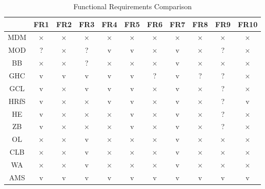 \begin{table}[H]
    \centering
    \bgroup
    \def\arraystretch{1.5}
    \begin{tabular}{|c|c|c|c|c|c|c|c|c|c|c|}
    \hline
         & FR1 & FR2 & FR3 & FR4 & FR5 & FR6 & FR7 & FR8 & FR9 & FR10 \\ \hline
        MDM & × & × & × & × & × & × & × & × & × & × \\ \hline
        MOD & ? & × & ? & v & v & × & v & × & ? & × \\ \hline
        BB & × & × & ? & × & × & × & v & × & × & × \\ \hline
        GHC & v & v & v & v & v & ? & v & ? & ? & × \\ \hline
        GCL & v & × & v & v & v & × & v & × & ? & × \\ \hline
        HRfS & v & × & × & v & v & × & v & × & ? & v \\ \hline
        HE & v & × & × & × & v & × & v & × & ? & × \\ \hline
        ZB & v & × & × & × & v & × & v & × & ? & × \\ \hline
        OL & × & × & v & × & × & × & v & × & × & × \\ \hline
        CLB & × & × & v & × & × & × & v & × & × & × \\ \hline
        WA & × & × & v & × & × & × & v & × & × & × \\ \hline
        AMS & v & v & v & v & v & v & v & v & v & v \\ \hline
    \end{tabular}
    \egroup
    \caption{Functional Requirements Comparison}
\end{table}
